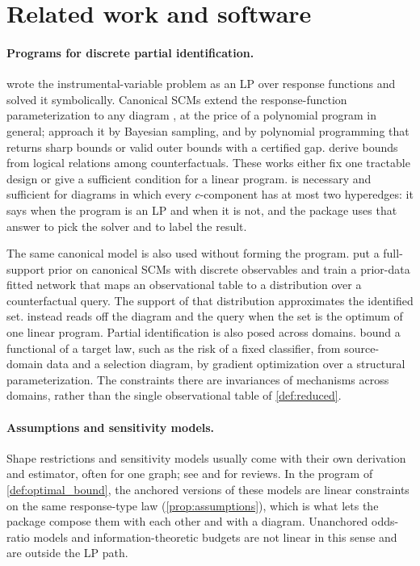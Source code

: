 \section{Related work and software}
\label{sec:related}

\paragraph{Programs for discrete partial identification.}
\citet{balke1994bounds,balke1997bounds} wrote the instrumental-variable
problem as an LP over response functions and solved it symbolically.
Canonical SCMs extend the response-function parameterization to any
diagram \citep{zhang2022partial}, at the price of a polynomial program in
general; \citet{zhang2022partial} approach it by Bayesian sampling, and
\citet{duarte2024automated} by polynomial programming that returns sharp
bounds or valid outer bounds with a certified gap.
\citet{finkelstein2020bounds} derive bounds from logical relations among
counterfactuals. These works either fix one tractable design or give a sufficient condition
for a linear program.  is necessary and sufficient for diagrams
in which every $c$-component has at most two hyperedges: it says when the
program is an LP and when it is not, and the package uses that answer to pick
the solver and to label the result.

The same canonical model is also used without forming the program.
\citet{bellot2026foundation} put a full-support prior on canonical SCMs with discrete observables and train a prior-data fitted network \citep{muller2022transformers} that maps an observational table to a distribution over a counterfactual query.
The support of that distribution approximates the identified set.
 instead reads off the diagram and the query when the set is the optimum of one linear program.
Partial identification is also posed across domains.
\citet{jalaldoust2024partial} bound a functional of a target law, such as the risk of a fixed classifier, from source-domain data and a selection diagram, by gradient optimization over a structural parameterization.
The constraints there are invariances of mechanisms across domains, rather than the single observational table of \cref{def:reduced}.

\paragraph{Assumptions and sensitivity models.}
Shape restrictions \citep{manski1990nonparametric,manski1997monotone,manski2000monotone}
and sensitivity models \citep{rosenbaum2002observational,tan2006distributional,masten2018identification,jin2023sensitivity}
usually come with their own derivation and estimator, often for one
graph; see \citet{tamer2010partial} and \citet{kline2023recent} for reviews.
In the program of \cref{def:optimal_bound}, the anchored versions of these
models are linear constraints on the same response-type law
(\cref{prop:assumptions}), which is what lets the package compose them with each other
and with a diagram. Unanchored odds-ratio models and information-theoretic
budgets \citep{jung2026information} are not linear in this sense and are
outside the LP path.

